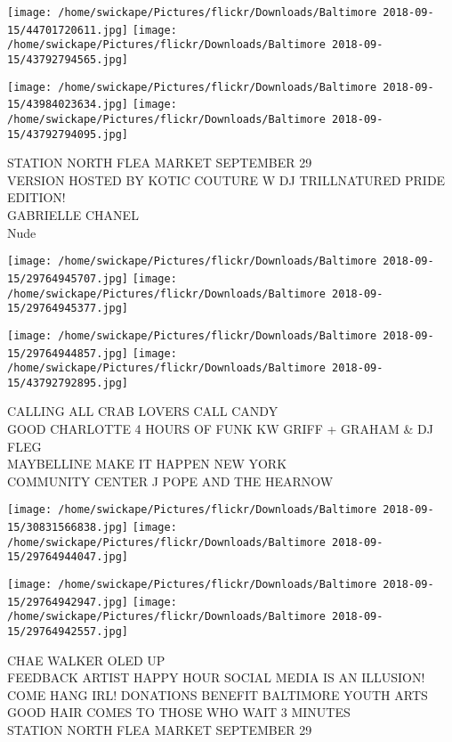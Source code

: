 \documentclass[10pt,letterpaper]{article}
\begin{document}
\texttt{[image: /home/swickape/Pictures/flickr/Downloads/Baltimore 2018-09-15/44701720611.jpg]}
\texttt{[image: /home/swickape/Pictures/flickr/Downloads/Baltimore 2018-09-15/43792794565.jpg]}

\texttt{[image: /home/swickape/Pictures/flickr/Downloads/Baltimore 2018-09-15/43984023634.jpg]}
\texttt{[image: /home/swickape/Pictures/flickr/Downloads/Baltimore 2018-09-15/43792794095.jpg]}

STATION NORTH FLEA MARKET SEPTEMBER 29\\
VERSION HOSTED BY KOTIC COUTURE W DJ TRILLNATURED PRIDE EDITION!\\
GABRIELLE CHANEL\\
Nude
\pagebreak

\texttt{[image: /home/swickape/Pictures/flickr/Downloads/Baltimore 2018-09-15/29764945707.jpg]}
\texttt{[image: /home/swickape/Pictures/flickr/Downloads/Baltimore 2018-09-15/29764945377.jpg]}

\texttt{[image: /home/swickape/Pictures/flickr/Downloads/Baltimore 2018-09-15/29764944857.jpg]}
\texttt{[image: /home/swickape/Pictures/flickr/Downloads/Baltimore 2018-09-15/43792792895.jpg]}

CALLING ALL CRAB LOVERS CALL CANDY\\
GOOD CHARLOTTE 4 HOURS OF FUNK KW GRIFF + GRAHAM \& DJ FLEG\\
MAYBELLINE MAKE IT HAPPEN NEW YORK\\
COMMUNITY CENTER J POPE AND THE HEARNOW
\pagebreak

\texttt{[image: /home/swickape/Pictures/flickr/Downloads/Baltimore 2018-09-15/30831566838.jpg]}
\texttt{[image: /home/swickape/Pictures/flickr/Downloads/Baltimore 2018-09-15/29764944047.jpg]}

\texttt{[image: /home/swickape/Pictures/flickr/Downloads/Baltimore 2018-09-15/29764942947.jpg]}
\texttt{[image: /home/swickape/Pictures/flickr/Downloads/Baltimore 2018-09-15/29764942557.jpg]}

CHAE WALKER OLED UP\\
FEEDBACK ARTIST HAPPY HOUR SOCIAL MEDIA IS AN ILLUSION!  COME HANG IRL!  DONATIONS BENEFIT BALTIMORE YOUTH ARTS\\
GOOD HAIR COMES TO THOSE WHO WAIT 3 MINUTES\\
STATION NORTH FLEA MARKET SEPTEMBER 29
\pagebreak
\end{document}
